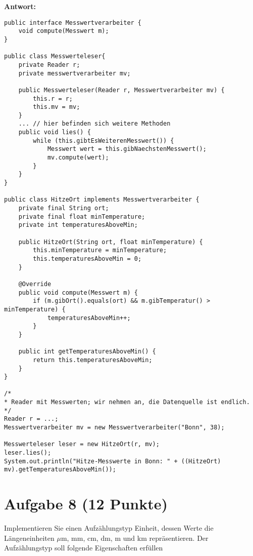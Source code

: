 {\textbf{Antwort:}

\begin{lstlisting}
public interface Messwertverarbeiter {
    void compute(Messwert m);
}

public class Messwerteleser{
    private Reader r;
    private messwertverarbeiter mv;

    public Messwerteleser(Reader r, Messwertverarbeiter mv) {
        this.r = r;
        this.mv = mv;
    }
    ... // hier befinden sich weitere Methoden
    public void lies() {
        while (this.gibtEsWeiterenMesswert()) {
            Messwert wert = this.gibNaechstenMesswert();
            mv.compute(wert);
        }
    }
}

public class HitzeOrt implements Messwertverarbeiter {
    private final String ort;
    private final float minTemperature;
    private int temperaturesAboveMin;

    public HitzeOrt(String ort, float minTemperature) {
        this.minTemperature = minTemperature;
        this.temperaturesAboveMin = 0;
    }

    @Override
    public void compute(Messwert m) {
        if (m.gibOrt().equals(ort) && m.gibTemperatur() > minTemperature) {
            temperaturesAboveMin++;
        }
    }

    public int getTemperaturesAboveMin() {
        return this.temperaturesAboveMin;
    }
}

/*
* Reader mit Messwerten; wir nehmen an, die Datenquelle ist endlich.
*/
Reader r = ...;
Messwertverarbeiter mv = new Messwertverarbeiter("Bonn", 38);

Messwerteleser leser = new HitzeOrt(r, mv);
leser.lies();
System.out.println("Hitze-Messwerte in Bonn: " + ((HitzeOrt) mv).getTemperaturesAboveMin());
\end{lstlisting}

\section{Aufgabe 8 (12 Punkte)}

Implementieren Sie einen Aufzählungstyp Einheit, dessen Werte die
Längeneinheiten $\mu$m, mm, cm, dm, m und km repräsentieren. Der Aufzählungstyp
soll folgende Eigenschaften erfüllen

}
